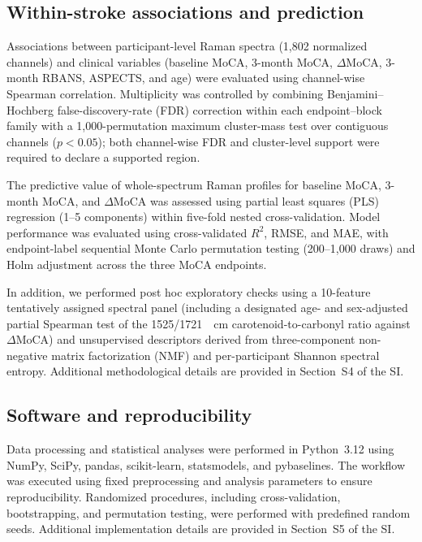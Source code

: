 \documentclass[preprint,12pt]{elsarticle}
\begin{document}
\subsection{Within-stroke associations and prediction} \label{subsec:clinical_methods}

Associations between participant-level Raman spectra (1,802 normalized channels) and clinical variables (baseline MoCA, 3-month MoCA, $\Delta$MoCA, 3-month RBANS, ASPECTS, and age) were evaluated using channel-wise Spearman correlation. Multiplicity was controlled by combining Benjamini--Hochberg false-discovery-rate (FDR) correction within each endpoint--block family with a 1,000-permutation maximum cluster-mass test over contiguous channels ($p<0.05$); both channel-wise FDR and cluster-level support were required to declare a supported region.

The predictive value of whole-spectrum Raman profiles for baseline MoCA, 3-month MoCA, and $\Delta$MoCA was assessed using partial least squares (PLS) regression (1--5 components) within five-fold nested cross-validation. Model performance was evaluated using cross-validated $R^2$, RMSE, and MAE, with endpoint-label sequential Monte Carlo permutation testing (200--1,000 draws) and Holm adjustment across the three MoCA endpoints.

In addition, we performed post hoc exploratory checks using a 10-feature tentatively assigned spectral panel (including a designated age- and sex-adjusted partial Spearman test of the 1525/1721~\si{\per\centi\metre} carotenoid-to-carbonyl ratio against $\Delta$MoCA) and unsupervised descriptors derived from three-component non-negative matrix factorization (NMF) and per-participant Shannon spectral entropy. Additional methodological details are provided in Section~S4 of the SI.


\subsection{Software and reproducibility}
\label{subsec:software}

Data processing and statistical analyses were performed in Python~3.12 using NumPy, SciPy, pandas, scikit-learn, statsmodels, and pybaselines. The workflow was executed using fixed preprocessing and analysis parameters to ensure reproducibility. Randomized procedures, including cross-validation, bootstrapping, and permutation testing, were performed with predefined random seeds. Additional implementation details are provided in Section~S5 of the SI.
\end{document}
